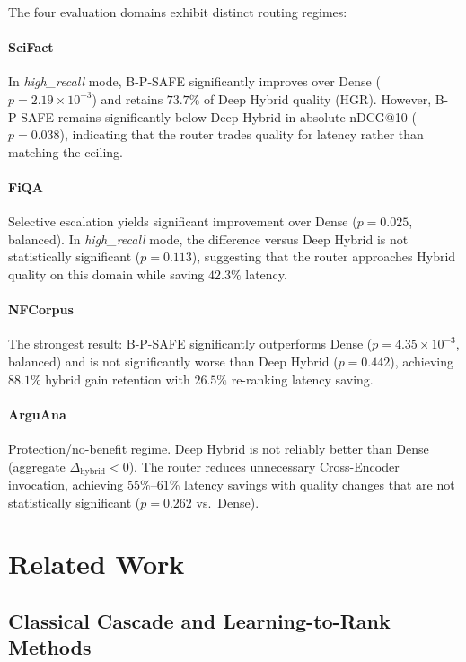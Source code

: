 \documentclass[journal]{IEEEtran}
\begin{document}
The four evaluation domains exhibit distinct routing regimes:

\paragraph{SciFact}
In \textit{high\_recall} mode, B-P-SAFE significantly improves over
Dense ($p = 2.19 \times 10^{-3}$) and retains $73.7\%$ of Deep
Hybrid quality (HGR). However, B-P-SAFE remains significantly below
Deep Hybrid in absolute nDCG@10 ($p = 0.038$), indicating that the
router trades quality for latency rather than matching the ceiling.

\paragraph{FiQA}
Selective escalation yields significant improvement over Dense
($p = 0.025$, balanced). In \textit{high\_recall} mode, the
difference versus Deep Hybrid is not statistically significant
($p = 0.113$), suggesting that the router approaches Hybrid
quality on this domain while saving $42.3\%$ latency.

\paragraph{NFCorpus}
The strongest result: B-P-SAFE significantly outperforms Dense
($p = 4.35 \times 10^{-3}$, balanced) and is not significantly
worse than Deep Hybrid ($p = 0.442$), achieving $88.1\%$ hybrid gain
retention with $26.5\%$ re-ranking latency saving.

\paragraph{ArguAna}
Protection/no-benefit regime. Deep Hybrid is not reliably better
than Dense (aggregate $\Delta_{\text{hybrid}} < 0$). The router
reduces unnecessary Cross-Encoder invocation, achieving
$55\%$--$61\%$ latency savings with quality changes that are
not statistically significant ($p = 0.262$ vs.\ Dense).

\section{Related Work}
\label{sec:related}
\subsection{Classical Cascade and Learning-to-Rank Methods}
\end{document}
